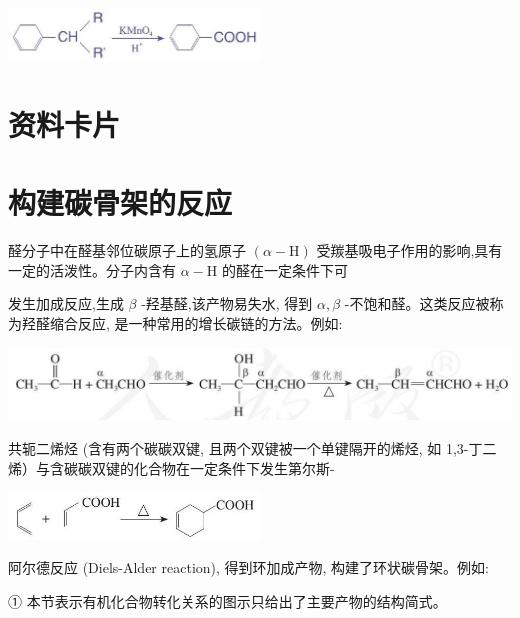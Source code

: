 \documentclass[10pt]{article}
\begin{document}
\begin{center}
\includegraphics[max width=0.5\textwidth]{images/0190efc5-b58a-7c43-bfb0-e0a030df9cfd_90_762780.jpg}
\end{center}

\section*{资料卡片}

\section*{构建碳骨架的反应}

醛分子中在醛基邻位碳原子上的氢原子 \(\left( {\alpha - \mathrm{H}}\right)\) 受羰基吸电子作用的影响,具有一定的活泼性。分子内含有 \(\alpha - \mathrm{H}\) 的醛在一定条件下可

发生加成反应,生成 \(\beta\) -羟基醛,该产物易失水, 得到 \(\alpha ,\beta\) -不饱和醛。这类反应被称为羟醛缩合反应, 是一种常用的增长碳链的方法。例如:

\begin{center}
\includegraphics[max width=1.0\textwidth]{images/0190efc5-b58a-7c43-bfb0-e0a030df9cfd_90_571016.jpg}
\end{center}

共轭二烯烃 (含有两个碳碳双键, 且两个双键被一个单键隔开的烯烃, 如 1,3-丁二烯）与含碳碳双键的化合物在一定条件下发生第尔斯-

\begin{center}
\includegraphics[max width=0.5\textwidth]{images/0190efc5-b58a-7c43-bfb0-e0a030df9cfd_90_507461.jpg}
\end{center}

阿尔德反应 (Diels-Alder reaction), 得到环加成产物, 构建了环状碳骨架。例如:

① 本节表示有机化合物转化关系的图示只给出了主要产物的结构简式。
\end{document}
